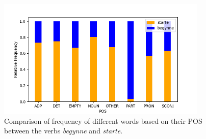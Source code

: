 \documentclass{article}
\begin{document}








\begin{figure}[htp]
    \centering
    \includegraphics[width=10cm]{pics/barplot_pos.png}
    \caption{Comparison of frequency of different words based on their POS between the verbs \emph{begynne} and \emph{starte}.}
    \label{fig:barplot_pos}
\end{figure}
\end{document}
